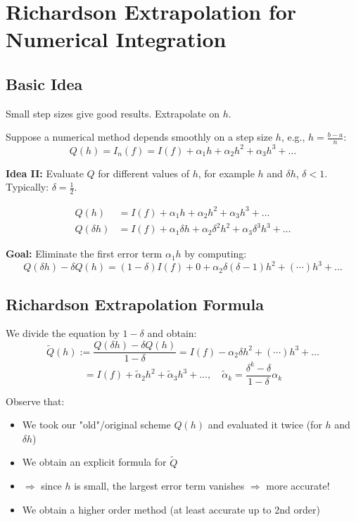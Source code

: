 \section{Richardson Extrapolation for Numerical Integration}

\subsection{Basic Idea}

Small step sizes give good results. Extrapolate on $h$.

Suppose a numerical method depends smoothly on a step size $h$, e.g., $h = \frac{b-a}{n}$:
\[Q(h) = I_n(f) = I(f) + \alpha_1 h + \alpha_2 h^2 + \alpha_3 h^3 + \ldots\]

\textbf{Idea II:} Evaluate $Q$ for different values of $h$, for example $h$ and $\delta h$, $\delta < 1$. Typically: $\delta = \frac{1}{2}$.

\begin{align}
Q(h) &= I(f) + \alpha_1 h + \alpha_2 h^2 + \alpha_3 h^3 + \ldots \\
Q(\delta h) &= I(f) + \alpha_1 \delta h + \alpha_2 \delta^2 h^2 + \alpha_3 \delta^3 h^3 + \ldots
\end{align}

\textbf{Goal:} Eliminate the first error term $\alpha_1 h$ by computing:
\[Q(\delta h) - \delta Q(h) = (1-\delta) I(f) + 0 + \alpha_2 \delta (\delta - 1) h^2 + (\cdots) h^3 + \ldots\]

\subsection{Richardson Extrapolation Formula}

We divide the equation by $1-\delta$ and obtain:
\[\tilde{Q}(h) := \frac{Q(\delta h) - \delta Q(h)}{1-\delta} = I(f) - \alpha_2 \delta h^2 + (\cdots) h^3 + \ldots\]
\[= I(f) + \tilde{\alpha}_2 h^2 + \tilde{\alpha}_3 h^3 + \ldots, \quad \tilde{\alpha}_k = \frac{\delta^k - \delta}{1-\delta} \alpha_k\]

Observe that:
\begin{itemize}
    \item We took our "old"/original scheme $Q(h)$ and evaluated it twice (for $h$ and $\delta h$)
    \item We obtain an explicit formula for $\tilde{Q}$
    \item $\Rightarrow$ since $h$ is small, the largest error term vanishes $\Rightarrow$ more accurate!
    \item We obtain a higher order method (at least accurate up to 2nd order)
\end{itemize}

